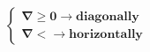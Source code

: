 \documentclass[preview]{standalone}
\begin{document}
\begin{center}
$\boldsymbol{\begin{cases}\nabla\ge0\rightarrow diagonally\\\nabla<\rightarrow horizontally\end{cases}}$
\end{center}
\end{document}
